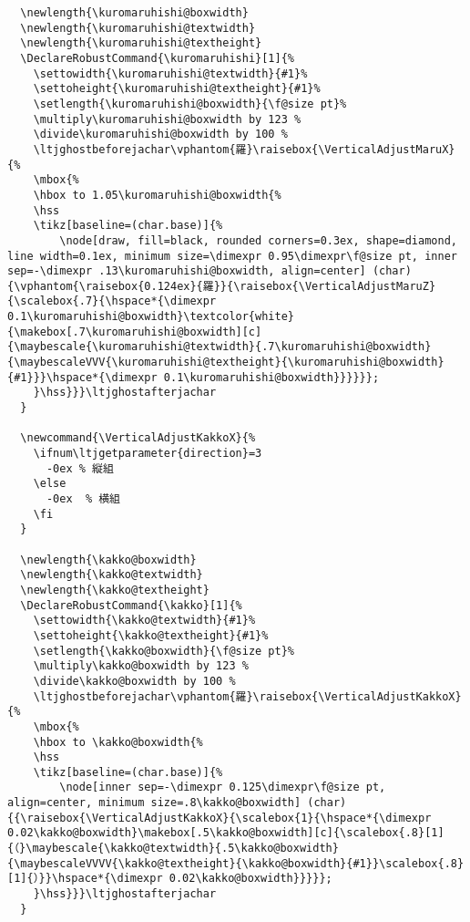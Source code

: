 \documentclass[luatex,fontsize=10pt,paper=b5,twoside]{jlreq}%
\begin{document}
\begin{lstlisting}
  \newlength{\kuromaruhishi@boxwidth}
  \newlength{\kuromaruhishi@textwidth}
  \newlength{\kuromaruhishi@textheight}
  \DeclareRobustCommand{\kuromaruhishi}[1]{%
    \settowidth{\kuromaruhishi@textwidth}{#1}%
    \settoheight{\kuromaruhishi@textheight}{#1}%
    \setlength{\kuromaruhishi@boxwidth}{\f@size pt}%
    \multiply\kuromaruhishi@boxwidth by 123 %
    \divide\kuromaruhishi@boxwidth by 100 %
    \ltjghostbeforejachar\vphantom{羅}\raisebox{\VerticalAdjustMaruX}{%
    \mbox{%
    \hbox to 1.05\kuromaruhishi@boxwidth{%
    \hss
    \tikz[baseline=(char.base)]{%
        \node[draw, fill=black, rounded corners=0.3ex, shape=diamond, line width=0.1ex, minimum size=\dimexpr 0.95\dimexpr\f@size pt, inner sep=-\dimexpr .13\kuromaruhishi@boxwidth, align=center] (char) {\vphantom{\raisebox{0.124ex}{羅}}{\raisebox{\VerticalAdjustMaruZ}{\scalebox{.7}{\hspace*{\dimexpr 0.1\kuromaruhishi@boxwidth}\textcolor{white}{\makebox[.7\kuromaruhishi@boxwidth][c]{\maybescale{\kuromaruhishi@textwidth}{.7\kuromaruhishi@boxwidth}{\maybescaleVVV{\kuromaruhishi@textheight}{\kuromaruhishi@boxwidth}{#1}}}\hspace*{\dimexpr 0.1\kuromaruhishi@boxwidth}}}}}};
    }\hss}}}\ltjghostafterjachar
  }

  \newcommand{\VerticalAdjustKakkoX}{%
    \ifnum\ltjgetparameter{direction}=3
      -0ex % 縦組
    \else
      -0ex  % 横組
    \fi
  }

  \newlength{\kakko@boxwidth}
  \newlength{\kakko@textwidth}
  \newlength{\kakko@textheight}
  \DeclareRobustCommand{\kakko}[1]{%
    \settowidth{\kakko@textwidth}{#1}%
    \settoheight{\kakko@textheight}{#1}%
    \setlength{\kakko@boxwidth}{\f@size pt}%
    \multiply\kakko@boxwidth by 123 %
    \divide\kakko@boxwidth by 100 %
    \ltjghostbeforejachar\vphantom{羅}\raisebox{\VerticalAdjustKakkoX}{%
    \mbox{%
    \hbox to \kakko@boxwidth{%
    \hss
    \tikz[baseline=(char.base)]{%
        \node[inner sep=-\dimexpr 0.125\dimexpr\f@size pt, align=center, minimum size=.8\kakko@boxwidth] (char) {{\raisebox{\VerticalAdjustKakkoX}{\scalebox{1}{\hspace*{\dimexpr 0.02\kakko@boxwidth}\makebox[.5\kakko@boxwidth][c]{\scalebox{.8}[1]{（}\maybescale{\kakko@textwidth}{.5\kakko@boxwidth}{\maybescaleVVVV{\kakko@textheight}{\kakko@boxwidth}{#1}}\scalebox{.8}[1]{）}}\hspace*{\dimexpr 0.02\kakko@boxwidth}}}}};
    }\hss}}}\ltjghostafterjachar
  }


\end{lstlisting}
\end{document}

